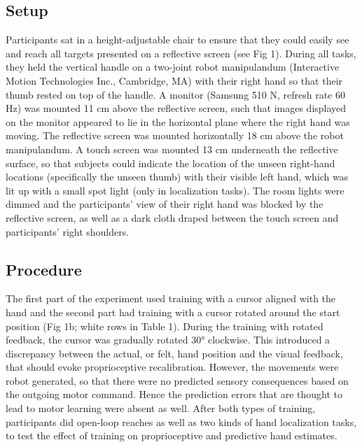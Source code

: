 \documentclass[10pt,letterpaper]{article}
\begin{document}
\subsection{Setup}\label{setup}

Participants sat in a height-adjustable chair to ensure that they could
easily see and reach all targets presented on a reflective screen (see
Fig 1). During all tasks, they held the vertical handle on a two-joint
robot manipulandum (Interactive Motion Technologies Inc., Cambridge, MA)
with their right hand so that their thumb rested on top of the handle. A
monitor (Samsung 510 N, refresh rate 60 Hz) was mounted 11 cm above the
reflective screen, such that images displayed on the monitor appeared to
lie in the horizontal plane where the right hand was moving. The
reflective screen was mounted horizontally 18 cm above the robot
manipulandum. A touch screen was mounted 13 cm underneath the reflective
surface, so that subjects could indicate the location of the unseen
right-hand locations (specifically the unseen thumb) with their visible
left hand, which was lit up with a small spot light (only in
localization tasks). The room lights were dimmed and the participants'
view of their right hand was blocked by the reflective screen, as well
as a dark cloth draped between the touch screen and participants' right
shoulders.

\subsection{Procedure}\label{procedure}

The first part of the experiment used training with a cursor aligned
with the hand and the second part had training with a cursor rotated
around the start position (Fig 1b; white rows in Table 1). During the
training with rotated feedback, the cursor was gradually rotated 30°
clockwise. This introduced a discrepancy between the actual, or felt,
hand position and the visual feedback, that should evoke proprioceptive
recalibration. However, the movements were robot generated, so that
there were no predicted sensory consequences based on the outgoing motor
command. Hence the prediction errors that are thought to lead to motor
learning were absent as well. After both types of training, participants
did open-loop reaches as well as two kinds of hand localization tasks,
to test the effect of training on proprioceptive and predictive hand
estimates.

\newcommand{\headrow}{\rowcolor{black!20}}
\newcommand{\thead}[1]{\multicolumn{1}{l}{\bfseries #1\rule[-1.2ex]{0pt}{2em}}}
\end{document}
